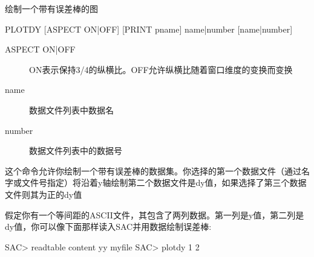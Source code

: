 \label{cmd:plotdy}

绘制一个带有误差棒的图

\begin{SACSTX}
PLOTDY [ASPECT ON|OFF] [PRINT pname] name|number [name|number]
\end{SACSTX}

\begin{description}
\item [ASPECT ON|OFF] ON表示保持3/4的纵横比。OFF允许纵横比随着窗口维度的变换而变换
\item [name] 数据文件列表中数据名
\item [number] 数据文件列表中的数据号
\end{description}

这个命令允许你绘制一个带有误差棒的数据集。你选择的第一个数据文件（通过名字或文件号指定）将沿着y轴绘制第二个数据文件是dy值，如果选择了第三个数据文件则其为正的dy值

假定你有一个等间距的ASCII文件，其包含了两列数据。第一列是y值，第二列是dy值，你可以像下面那样读入SAC并用数据绘制误差棒:
\begin{SACCode}
SAC> readtable content yy myfile
SAC> plotdy 1 2
\end{SACCode}
